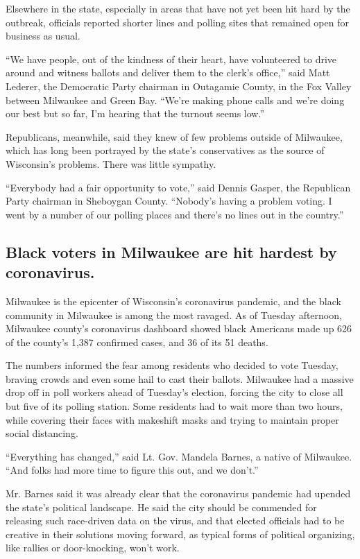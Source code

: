 Elsewhere in the state, especially in areas that have not yet been hit
hard by the outbreak, officials reported shorter lines and polling sites
that remained open for business as usual.

``We have people, out of the kindness of their heart, have volunteered
to drive around and witness ballots and deliver them to the clerk's
office,'' said Matt Lederer, the Democratic Party chairman in Outagamie
County, in the Fox Valley between Milwaukee and Green Bay. ``We're
making phone calls and we're doing our best but so far, I'm hearing that
the turnout seems low.''

Republicans, meanwhile, said they knew of few problems outside of
Milwaukee, which has long been portrayed by the state's conservatives as
the source of Wisconsin's problems. There was little sympathy.

``Everybody had a fair opportunity to vote,'' said Dennis Gasper, the
Republican Party chairman in Sheboygan County. ``Nobody's having a
problem voting. I went by a number of our polling places and there's no
lines out in the country.''

\hypertarget{black-voters-in-milwaukee-are-hit-hardest-by-coronavirus}{%
\subsection{Black voters in Milwaukee are hit hardest by
coronavirus.}\label{black-voters-in-milwaukee-are-hit-hardest-by-coronavirus}}

Milwaukee is the epicenter of Wisconsin's coronavirus pandemic, and the
black community in Milwaukee is among the most ravaged. As of Tuesday
afternoon, Milwaukee county's coronavirus dashboard showed black
Americans made up 626 of the county's 1,387 confirmed cases, and 36 of
its 51 deaths.

The numbers informed the fear among residents who decided to vote
Tuesday, braving crowds and even some hail to cast their ballots.
Milwaukee had a massive drop off in poll workers ahead of Tuesday's
election, forcing the city to close all but five of its polling station.
Some residents had to wait more than two hours, while covering their
faces with makeshift masks and trying to maintain proper social
distancing.

``Everything has changed,'' said Lt. Gov. Mandela Barnes, a native of
Milwaukee. ``And folks had more time to figure this out, and we don't.''

Mr. Barnes said it was already clear that the coronavirus pandemic had
upended the state's political landscape. He said the city should be
commended for releasing such race-driven data on the virus, and that
elected officials had to be creative in their solutions moving forward,
as typical forms of political organizing, like rallies or door-knocking,
won't work.

